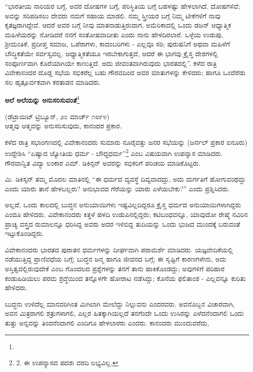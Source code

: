 “ಭಾರತೀಯ ನಾರಿಯರ ಬಗ್ಗೆ, ಅವರ ದೋಷಗಳ ಬಗ್ಗೆ, ಪರಿಸ್ಥಿತಿಯ ಬಗ್ಗೆ ಬಹಳಷ್ಟು ಹೇಳಲಾಗಿದೆ. ದೋಷಗಳಿವೆ; ಅವನ್ನು ಸರಿಪಡಿಸಲು ದೇವರು ನಮಗೆ ಸಹಾಯ ಮಾಡಲಿ. ನಮ್ಮ ಸ್ತ್ರೀಯರ ಬಗ್ಗೆ ನಿಮ್ಮ ಟೀಕೆಗಳಿಗೆ ನಾವು ಕೃತಜ್ಞರಾಗಿದ್ದೇವೆ. ಆದರೆ ಅವರ ಬಗ್ಗೆ ನೀವು ಮಾತನಾಡುತ್ತಿರುವಾಗ, ಅಮೆರಿಕಾದಲ್ಲಿ ಒಂದು ಡಜನ್ ಆಧ್ಯಾತ್ಮಿಕ ಮಹಿಳೆಯರನ್ನು ನೋಡಿದರೆ ನನಗೆ ಸಂತೋಷವಾದೀತು ಎಂದು ನಾನು ಹೇಳದಿರಲಾರೆ. ಒಳ್ಳೆಯ ಉಡುಪು, ಶ‍್ರೀಮಂತಿಕೆ, ಪ್ರದೀಪ್ತ ಸಮಾಜ, ಒಪೆರಾಗಳು, ಕಾದಂಬರಿಗಳು - ಎಲ್ಲವೂ ಸರಿ; ಪುರುಷನಿಗೆ ಅಥವಾ ಮಹಿಳೆಗೆ ಬೌದ್ಧಿಕತೆಯೇ ಸರ್ವಸ್ವವಲ್ಲ. ಆಧ್ಯಾತ್ಮಿಕತೆಯೂ ಇರಬೇಕಾಗುತ್ತದೆ, ಆದರೆ ಈ ಭಾಗವು ಕ್ರೈಸ್ತ ದೇಶಗಳಲ್ಲಿ ಸಂಪೂರ್ಣವಾಗಿ ಕೊರೆಯಾಗಿಯೇ ಕಾಣುತ್ತಿದೆ. ಅದು ಜೀವಂತವಾಗಿರುವುದು ಭಾರತದಲ್ಲಿ”. ಕಳೆದ ರಾತ್ರಿ ವಿವೇಕಾನಂದರ ದೊಡ್ಡ ಸಭೆಯ ಸಭಿಕರೆಲ್ಲ ಬಹು ಗೌರವದಿಂದ ಅವರ ಮಾತುಗಳನ್ನು ಕೇಳಿದರು; ಹಾಗೂ ಒಂದೆರೆಡು ಸಲ ಹೃತ್ಪೂರ್ವಕವಾಗಿ ಕರತಾಡನ ಮಾಡಿದರು.

\begin{center}
\textbf{ಅಲೆ ಅಲೆಯನ್ನು ಅನುಸರಿಸುವಂತೆ}\footnote{}
\end{center}

\begin{center}
(ಡೆಟ್ರಾಯಿಟ್ ಟ್ರಿಬ್ಯೂನ್, ೨೦ ಮಾರ್ಚ್ ೧೮೯೪)\\ಆತ್ಮವು ಆತ್ಮವನ್ನು ಅನುಸರಿಸುವುದು, ಕಾನಂದರ ಪ್ರಕಾರ.
\end{center}

ಕಳೆದ ರಾತ್ರಿ ಸಭಾಂಗಣದಲ್ಲಿ ವಿವೇಕಾನಂದರು ಸುಮಾರು ನೂರೈವತ್ತು ಜನರ ಸಭೆಯನ್ನು (ಜರ್ನಲ್ ಪ್ರಕಾರ ಐನೂರು) ಉದ್ದೇಶಿಸಿ “ಏಷ್ಯಾದ ಜ್ಯೋತಿಯ ಧರ್ಮ - ಬೌದ್ಧಧರ್ಮ”\footnote{2. ಈ ಉಪನ್ಯಾಸದ ಪದಶಃ ವರದಿ ಲಭ್ಯವಿಲ್ಲ.} ಎಂಬ ವಿಷಯವಾಗಿ ಉಪನ್ಯಾಸ ಮಾಡಿದರು. ಗೌರವಾನ್ವಿತ ವಿದ್ಯಾ ಲಂಕಾರ ಎಮ್​. ಡಿಕಿನ್ಸನ್ ಅವರನ್ನು ಸಭಿಕರಿಗೆ ಪರಿಚಯ ಮಾಡಿಕೊಟ್ಟರು.

ಮಿ. ಡಿಕಿಸ್ಸನ್ ತಮ್ಮ ಮೊದಲ ಮಾತಿನಲ್ಲಿ “ಈ ಧರ್ಮದ ವ್ಯವಸ್ಥೆ ದಿವ್ಯವಾದದ್ದು, ಅದು ದುರ್ಗತಿಗೆ ಹೋಗುವಂಥದ್ದು ಎಂದು ಯಾರು ತಾನೆ ಹೇಳಬಲ್ಲರು? ಅನುಭಾವದ ಗೆರೆಯನ್ನು ಯಾರು ಎಳೆಯಬೇಕು?” ಎಂದು ಪ್ರಶ್ನಿಸಿದರು.

ಅಲ್ಲದೆ, ಒಂದು ಕಾಲದಲ್ಲಿ ಬುದ್ಧನ ಅನುಯಾಯಿಗಳು ಇಷ್ಟವಿಲ್ಲದಿದ್ದರೂ ಕ್ರೈಸ್ತ ಧರ್ಮದ ಅನುಯಾಯಿಗಳಾಗಿದ್ದರು ಎಂದೂ ಹೇಳಿದರು. ವಿವೇಕಾನಂದರು ಕಿತ್ತಳೆ ಹಳದಿ ಉಡುಪಿನಲ್ಲಿದ್ದರು; ಕಟಿಬಂಧವನ್ನೂ, ಯಾವುದೋ ರೇಷ್ಮೆ ನವಿರಿನ ಪ್ರಾಚ್ಯ ವಸ್ತ್ರದ ರುಮಾಲನ್ನೂ ಧರಿಸಿದ್ದ ಅವರು ಅದರ ಇಳಿಬಿದ್ದ ತುದಿಯನ್ನು ಒಂದು ಭುಜದ ಮುಂದಕ್ಕೆ ಬರುವಂತೆ ಇಟ್ಟುಕೊಂಡಿದ್ದರು.

ವಿವೇಕಾನಂದರು ಭಾರತದ ಪುರಾತನ ಧರ್ಮಗಳನ್ನು ದೀರ್ಘವಾಗಿ ಪರಾಮರ್ಶೆ ಮಾಡಿದರು. ಯಜ್ಞವೇದಿಕೆಯಲ್ಲಿ ನಡೆಯುತ್ತಿದ್ದ ಪ್ರಾಣಿವಧೆಯ ಬಗ್ಗೆ; ಬುದ್ಧನ ಜನ್ಮ ಹಾಗೂ ಜೀವನದ ಬಗ್ಗೆ; ಈ ಸೃಷ್ಟಿಗೆ ಕಾರಣಗಳೇನು, ಅದು ಅಸ್ತಿತ್ವದಲ್ಲಿರುವುದೇಕೆ ಎಂಬ ಗೊಂದಲದ ಪ್ರಶ್ನೆಗಳನ್ನು ತನಗೆ ತಾನು ಹಾಕಿಕೊಂಡದ್ದು; ಅವುಗಳಿಗೆ ಪರಿಹಾರ ಕಂಡುಹಿಡಿಯಲು ಪರಮ ಶ್ರದ್ಧೆಯಿಂದ ತನ್ನೊಳಗೇ ಹೋರಾಟ ನಡೆಸಿದ್ದು; ಕೊನೆಯ ಫಲಿತಾಂಶ - ಎಲ್ಲವನ್ನೂ ಕುರಿತು ಹೇಳಿದರು.

ಬುದ್ಧನು ಉಳಿದೆಲ್ಲ ಮಾನವರಿಗಿಂತ ಮಿಗಿಲಾಗಿ ಮೇಲೆದ್ದು ನಿಲ್ಲುವನು ಎಂದರವರು. ಅವನೊಬ್ಬನ ವಿಚಾರವಾಗಿ, ಅವನ ಮಿತ್ರರಾಗಲಿ ಶತ್ರುಗಳಾಗಲಿ, ಎಲ್ಲರ ಹಿತಕ್ಕಾಗಿಯಲ್ಲದೆ ತನಗೆಂದೇ ಒಂದು ಉಸಿರನ್ನು ಎಳೆದನೆಂದಾಗಲಿ ಒಂದು ತುತ್ತು ಅನ್ನವನ್ನು ತಿಂದನೆಂದಾಗಲಿ ಎಂದಿಗೂ ಹೇಳಲಾರರು ಎಂದರು. ಕಾನಂದರು ಮುಂದುವರೆದು,


